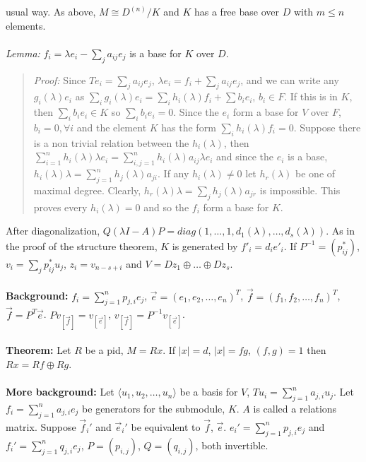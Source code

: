 usual way.  As above, $M \cong {D^{(n)}}/{K}$ and $K$ has a free base over $D$
with $m \le n$ elements.\\
\\
\emph{Lemma:} $f_i = \lambda e_i - \sum_j a_{ij}e_j$ is a base for $K$ over $D$.
\begin{quote}
\emph{Proof:}
Since $Te_i= \sum_j a_{ij} e_j$,
$\lambda e_i= f_i+ \sum_j a_{ij} e_j$, and we can write any $g_i(\lambda) e_i$ as
$\sum_i g_i( \lambda ) e_i = \sum_i h_i( \lambda )f_i + \sum b_i e_i$, $b_i \in F$.
If this is in $K$, then $\sum_i b_i e_i \in K$ so $\sum_i b_i e_i = 0$.
Since the $e_i$ form a base for $V$ over $F$, $b_i= 0, \forall i$ and the element
$K$ has the form $\sum_i h_i( \lambda) f_i = 0$.  Suppose there is a non trivial relation
between the $h_i( \lambda )$, then
$\sum_{i=1}^n h_i( \lambda) \lambda e_i = \sum_{i,j=1}^n h_i( \lambda) a_{ij} \lambda e_i$
and since the $e_i$ is a base,
$h_i( \lambda) \lambda = \sum_{j=1}^n h_j( \lambda) a_{ji}$.
If any $h_i( \lambda ) \ne 0$ let $h_r( \lambda )$ be one of maximal degree.
Clearly,
$h_r( \lambda ) \lambda = \sum_j h_j( \lambda ) a_{jr}$ is impossible.  This proves
every $h_i( \lambda) = 0$ 
and so the $f_i$ form a base for $K$.
\end{quote}
After diagonalization,
$Q (\lambda I -A) P = diag(1,\ldots,1,d_1(\lambda), \ldots , d_s(\lambda))$.
As in the proof of the structure theorem,
$K$ is generated by $f'_i= d_i e'_i$.  If
$P^{-1}= (p^*_{ij})$, $v_i= \sum_j p^*_{ij} u_j$, $z_i= v_{n-s+i}$ and
$V= D z_1 \oplus \ldots \oplus D z_s$.
\\
\\
{\bf Background:}
$f_i = \sum_{j=1}^n p_{j,i}e_j$,
${\vec e} = (e_1 , e_2 , \ldots , e_n)^T$,
${\vec f} = (f_1 , f_2 , \ldots , f_n)^T$,
${\vec f} = P^T {\vec e}$.
$P v_{[{\vec f}]} = v_{[{\vec e}]}$,
$v_{[{\vec f}]} = P^{-1}v_{[{\vec e}]}$.
\\
\\
{\bf Theorem:} Let $R$ be a pid, $M=Rx$.  If $|x|=d$, $|x|=fg$, $(f,g)=1$ then $Rx = Rf \oplus Rg$.
\\
\\
{\bf More background:} Let $\langle u_1 , u_2 , \ldots , u_n \rangle$ be a basis for $V$, $Tu_i = \sum_{j=1}^n a_{j,i}u_j$.
Let $f_i = \sum_{j=1}^n a_{j,i} e_j$ be generators for the submodule, $K$. $A$ is called a relations matrix.  Suppose
${\vec f_i'}$ and ${\vec e_i'}$ be equivalent to ${\vec f}$, ${\vec e}$.
$e_i' = \sum_{j=1}^n p_{j,i} e_j$ and
$f_i' = \sum_{j=1}^n q_{j,i} e_j$, $P=(p_{i,j})$, $Q=(q_{i,j})$, both invertible.
